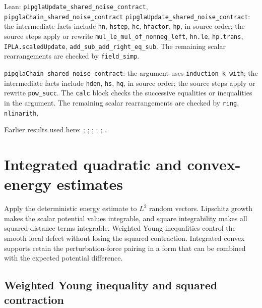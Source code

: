 \documentclass[11pt,a4paper]{report}
\begin{document}
\begin{leanbox}{Lean: \texttt{pipglaUpdate\_\allowbreak{}shared\_\allowbreak{}noise\_\allowbreak{}contract}, \texttt{pipglaChain\_\allowbreak{}shared\_\allowbreak{}noise\_\allowbreak{}contract}}
\texttt{pipgla\allowbreak{}Update\_\allowbreak{}shared\_\allowbreak{}noise\_\allowbreak{}contract}: the intermediate facts include \texttt{hn}, \texttt{hstep}, \texttt{hc}, \texttt{hfactor}, \texttt{hp}, in source order; the source steps apply or rewrite \texttt{mul\_\allowbreak{}le\_\allowbreak{}mul\_\allowbreak{}of\_\allowbreak{}nonneg\_\allowbreak{}left}, \texttt{hn.\allowbreak{}le}, \texttt{hp.\allowbreak{}trans}, \texttt{IPLA.\allowbreak{}scaled\allowbreak{}Update}, \texttt{add\_\allowbreak{}sub\_\allowbreak{}add\_\allowbreak{}right\_\allowbreak{}eq\_\allowbreak{}sub}. The remaining scalar rearrangements are checked by \texttt{field\_\allowbreak{}simp}.



\texttt{pipgla\allowbreak{}Chain\_\allowbreak{}shared\_\allowbreak{}noise\_\allowbreak{}contract}: the argument uses \texttt{induction k with}; the intermediate facts include \texttt{hden}, \texttt{hs}, \texttt{hq}, in source order; the source steps apply or rewrite \texttt{pow\_\allowbreak{}succ}. The \texttt{calc} block checks the successive equalities or inequalities in the argument. The remaining scalar rearrangements are checked by \texttt{ring}, \texttt{nlinarith}.
\end{leanbox}


Earlier results used here: \cite[Section~3.10.7]{LangevinLean2026ULASC}; \cite[Section~3.1.1]{LangevinLean2026IPLA}; \cite[Section~3.1.3]{LangevinLean2026IPLA}; \cite[Section~3.1.4]{LangevinLean2026IPLA}; \cite[Section~3.1.7]{LangevinLean2026IPLA}; \cite[Section~3.7.1]{LangevinLean2026IPLA}.
\section{\texorpdfstring{Integrated quadratic and convex-energy estimates}{Integrated quadratic and convex-energy estimates}}
\label{proof-module-ProximalLangevin-SplittingL2Energy-lean}


Apply the deterministic energy estimate to \(L^2\) random vectors. Lipschitz growth makes the scalar potential values integrable, and square integrability makes all squared-distance terms integrable. Weighted Young inequalities control the smooth local defect without losing the squared contraction. Integrated convex supports retain the perturbation-force pairing in a form that can be combined with the expected potential difference.

\subsection{\texorpdfstring{Weighted Young inequality and squared contraction}{Weighted Young inequality and squared contraction}}
\label{report-step-ProximalLangevin-SplittingL2Energy-lean-1}
\end{document}
